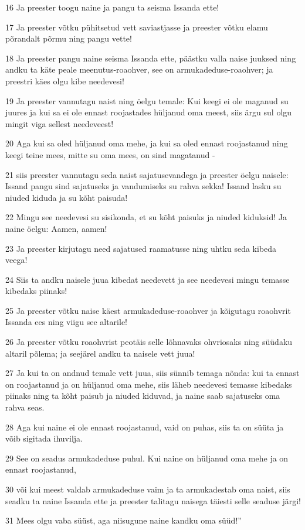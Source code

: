 \par 16 Ja preester toogu naine ja pangu ta seisma Issanda ette!
\par 17 Ja preester võtku pühitsetud vett saviastjasse ja preester võtku elamu põrandalt põrmu ning pangu vette!
\par 18 Ja preester pangu naine seisma Issanda ette, päästku valla naise juuksed ning andku ta käte peale meenutus-roaohver, see on armukadeduse-roaohver; ja preestri käes olgu kibe needevesi!
\par 19 Ja preester vannutagu naist ning öelgu temale: Kui keegi ei ole maganud su juures ja kui sa ei ole ennast roojastades hüljanud oma meest, siis ärgu sul olgu mingit viga sellest needeveest!
\par 20 Aga kui sa oled hüljanud oma mehe, ja kui sa oled ennast roojastanud ning keegi teine mees, mitte su oma mees, on sind magatanud -
\par 21 siis preester vannutagu seda naist sajatusevandega ja preester öelgu naisele: Issand pangu sind sajatuseks ja vandumiseks su rahva sekka! Issand lasku su niuded kiduda ja su kõht paisuda!
\par 22 Mingu see needevesi su sisikonda, et su kõht paisuks ja niuded kiduksid! Ja naine öelgu: Aamen, aamen!
\par 23 Ja preester kirjutagu need sajatused raamatusse ning uhtku seda kibeda veega!
\par 24 Siis ta andku naisele juua kibedat needevett ja see needevesi mingu temasse kibedaks piinaks!
\par 25 Ja preester võtku naise käest armukadeduse-roaohver ja kõigutagu roaohvrit Issanda ees ning viigu see altarile!
\par 26 Ja preester võtku roaohvrist peotäis selle lõhnavaks ohvriosaks ning süüdaku altaril põlema; ja seejärel andku ta naisele vett juua!
\par 27 Ja kui ta on andnud temale vett juua, siis sünnib temaga nõnda: kui ta ennast on roojastanud ja on hüljanud oma mehe, siis läheb needevesi temasse kibedaks piinaks ning ta kõht paisub ja niuded kiduvad, ja naine saab sajatuseks oma rahva seas.
\par 28 Aga kui naine ei ole ennast roojastanud, vaid on puhas, siis ta on süüta ja võib sigitada ihuvilja.
\par 29 See on seadus armukadeduse puhul. Kui naine on hüljanud oma mehe ja on ennast roojastanud,
\par 30 või kui meest valdab armukadeduse vaim ja ta armukadestab oma naist, siis seadku ta naine Issanda ette ja preester talitagu naisega täiesti selle seaduse järgi!
\par 31 Mees olgu vaba süüst, aga niisugune naine kandku oma süüd!”

